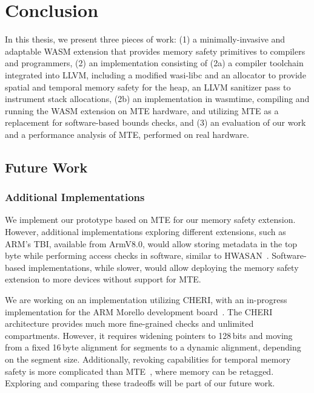\chapter{Conclusion}
\label{ch:conclusion}

In this thesis, we present three pieces of work:
(1) a minimally-invasive and adaptable \ac{WASM} extension that provides memory safety primitives to compilers and programmers,
(2) an implementation consisting of (2a) a compiler toolchain integrated into LLVM, including a modified wasi-libc and an allocator to provide spatial and temporal memory safety for the heap, an LLVM sanitizer pass to instrument stack allocations,
(2b) an implementation in wasmtime, compiling and running the \ac{WASM} extension on \ac{MTE} hardware, and utilizing \ac{MTE} as a replacement for software-based bounds checks,
and (3) an evaluation of our work and a performance analysis of \ac{MTE}, performed on real hardware.


\section{Future Work}
\label{sec:future-work}

\subsection{Additional Implementations}
\label{subsec:additional-implementations}

We implement our prototype based on \ac{MTE} for our memory safety extension.
However, additional implementations exploring different extensions, such as ARM's \ac{TBI}, available from ArmV8.0, would allow storing metadata in the top byte while performing access checks in software, similar to \ac{HWASAN}~\cite{serebryany2018memory}.
Software-based implementations, while slower, would allow deploying the memory safety extension to more devices without support for \ac{MTE}.

We are working on an implementation utilizing \ac{CHERI}, with an in-progress implementation for the ARM Morello development board~\cite{UCAM-CL-TR-982}.
The CHERI architecture provides much more fine-grained checks and unlimited compartments.
However, it requires widening pointers to 128\,bits and moving from a fixed 16\,byte alignment for segments to a dynamic alignment, depending on the segment size.
Additionally, revoking capabilities for temporal memory safety is more complicated than \ac{MTE}~\cite{xia2019cherivoke}, where memory can be retagged.
Exploring and comparing these tradeoffs will be part of our future work.

